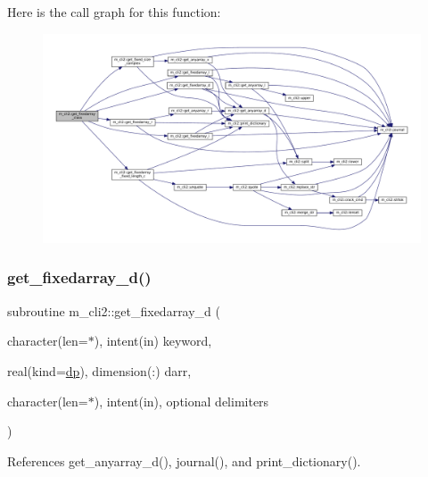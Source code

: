 Here is the call graph for this function\+:\nopagebreak
\begin{figure}[H]
\begin{center}
\leavevmode
\includegraphics[width=350pt]{namespacem__cli2_a6d8c1c441ac15f9a2882e50459d39565_cgraph}
\end{center}
\end{figure}
\mbox{\label{namespacem__cli2_a2c8db0f383888cb2b3ce8643de3fae93}} 
\subsubsection{\texorpdfstring{get\+\_\+fixedarray\+\_\+d()}{get\_fixedarray\_d()}}
{\footnotesize\ttfamily subroutine m\+\_\+cli2\+::get\+\_\+fixedarray\+\_\+d (\begin{DoxyParamCaption}\item[{character(len=$\ast$), intent(in)}]{keyword,  }\item[{real(kind=\mbox{\hyperlink{namespacem__cli2_acf83f1963cf6a56ad0221cfcf5402440}{dp}}), dimension(\+:)}]{darr,  }\item[{character(len=$\ast$), intent(in), optional}]{delimiters }\end{DoxyParamCaption})\hspace{0.3cm}{\ttfamily [private]}}



References get\+\_\+anyarray\+\_\+d(), journal(), and print\+\_\+dictionary().

